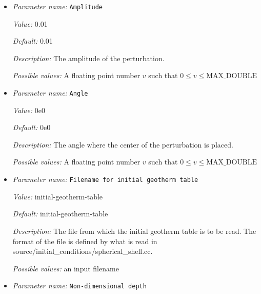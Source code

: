 \begin{itemize}
\item {\it Parameter name:} {\tt Amplitude}
\label{parameters:Initial temperature model/Spherical gaussian perturbation/Amplitude}
\label{parameters:Initial_20temperature_20model/Spherical_20gaussian_20perturbation/Amplitude}


{\it Value:} 0.01


{\it Default:} 0.01


{\it Description:} The amplitude of the perturbation.


{\it Possible values:} A floating point number $v$ such that $0 \leq v \leq \text{MAX\_DOUBLE}$
\item {\it Parameter name:} {\tt Angle}
\label{parameters:Initial temperature model/Spherical gaussian perturbation/Angle}
\label{parameters:Initial_20temperature_20model/Spherical_20gaussian_20perturbation/Angle}


{\it Value:} 0e0


{\it Default:} 0e0


{\it Description:} The angle where the center of the perturbation is placed.


{\it Possible values:} A floating point number $v$ such that $0 \leq v \leq \text{MAX\_DOUBLE}$
\item {\it Parameter name:} {\tt Filename for initial geotherm table}
\label{parameters:Initial temperature model/Spherical gaussian perturbation/Filename for initial geotherm table}
\label{parameters:Initial_20temperature_20model/Spherical_20gaussian_20perturbation/Filename_20for_20initial_20geotherm_20table}


{\it Value:} initial-geotherm-table


{\it Default:} initial-geotherm-table


{\it Description:} The file from which the initial geotherm table is to be read. The format of the file is defined by what is read in source/initial\_conditions/spherical\_shell.cc.


{\it Possible values:} an input filename
\item {\it Parameter name:} {\tt Non-dimensional depth}
\label{parameters:Initial temperature model/Spherical gaussian perturbation/Non_2ddimensional depth}
\label{parameters:Initial_20temperature_20model/Spherical_20gaussian_20perturbation/Non_2ddimensional_20depth}



\end{itemize}
